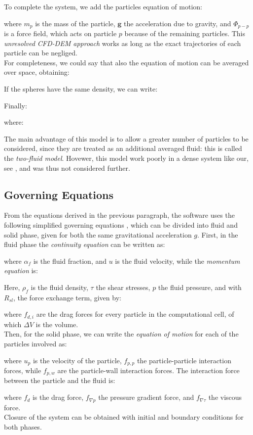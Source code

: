 
To complete the system, we add the particles equation of motion:

where $m_p$ is the mass of the particle, $\mathbf{g}$ the acceleration due to
gravity, and $\Phi_{p-p}$ is a force field, which acts on particle $p$ because
of the remaining particles.
This \textit{unresolved \acs{CFD}-\acs{DEM} approach} works as long as the exact
trajectories of each particle can be negliged.\\
For completeness, we could say that also the equation of motion can be averaged
over space, obtaining:

If the spheres have the same density, we can write:

Finally:

where:

The main advantage of this model is to allow a greater number of particles to be
considered, since they are treated as an additional averaged fluid: this is
called the \textit{two-fluid model}.
Hovewer, this model work poorly in a dense system like our, see
\citet{Refworks:202}, and was thus not considered further.

\subsection{Governing Equations}
\label{subsec:governingequations}
From the equations derived in the previous paragraph, the software uses the
following simplified governing equations \cite{Refworks:202}, which can be
divided into fluid and solid phase, given for both the same gravitational
acceleration $g$.
First, in the fluid phase the \textit{continuity equation} can be written as:

where $\alpha_f$ is the fluid fraction, and $u$ is the fluid velocity, while the
\textit{momentum equation} is:

Here, $\rho_f$ is the fluid density, $\tau$ the shear stresses, $p$ the fluid
pressure, and with $R_{sl}$, the force exchange term, given by:

where $f_{d,i}$ are the drag forces for every particle in the computational
cell, of which $\Delta V$ is the volume. \\
Then, for the solid phase, we can write the \textit{equation of motion} for each
of the particles involved as:

where $u_p$ is the velocity of the particle, $f_{p,p}$ the
particle-particle interaction forces, while $f_{p,w}$ are the particle-wall
interaction forces. The interaction force between the particle and the
fluid is:

where $f_d$ is the drag force, $f_{\nabla p}$ the pressure gradient force,
and $f_{\nabla \tau}$ the viscous force.\\
Closure of the system can be obtained with initial and
boundary conditions for both phases.

